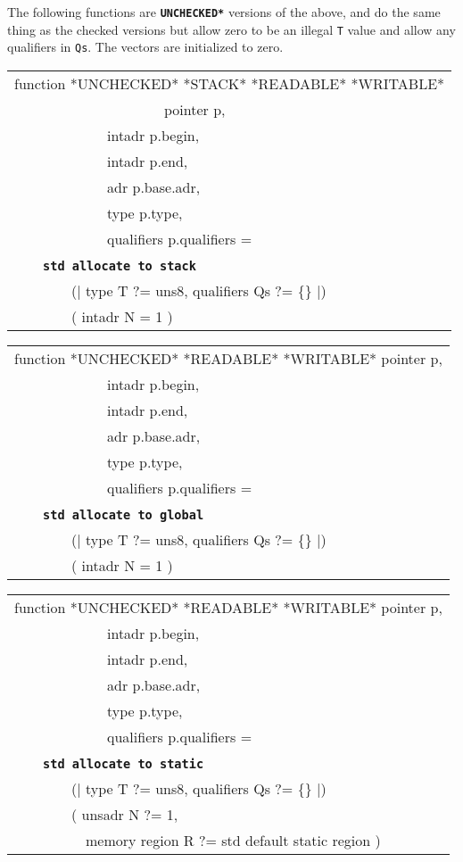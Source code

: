 \documentclass[12pt]{article}
\makeatletter
\newcommand{\TT}[1]{{\tt \bfseries #1}}
\newcommand{\ttstdkey}[1]{\TT{std #1}\index{#1@{\tt std #1}}}
\newenvironment{indpar}[1][0.3in]%
	{\begin{list}{}%
		     {\setlength{\itemsep}{0in}%
		      \setlength{\topsep}{0in}%
		      \setlength{\parsep}{1ex}%
		      \setlength{\labelwidth}{#1}%
		      \setlength{\leftmargin}{#1}%
		      \addtolength{\leftmargin}{\labelsep}}%
	 \item}%
	{\end{list}}
\makeatother
\begin{document}
The following functions are \TT{*UNCHECKED*} versions of the
above, and do the same thing as the checked versions but
allow zero to be an illegal {\tt T} value and allow any qualifiers
in {\tt Qs}.  The vectors are initialized to zero.

\begin{indpar}

{\tt\begin{tabular}{@{}l}
function *UNCHECKED* *STACK* *READABLE* *WRITABLE* \\
~~~~~~~~~~~~~~~~~~~~~pointer p, \\
~~~~~~~~~~~~~intadr p.begin, \\
~~~~~~~~~~~~~intadr p.end, \\
~~~~~~~~~~~~~adr p.base.adr, \\
~~~~~~~~~~~~~type p.type, \\
~~~~~~~~~~~~~qualifiers p.qualifiers = \\
~~~~\ttstdkey{allocate to stack} \\
~~~~~~~~(| type T ?= uns8, qualifiers Qs ?= \{\} |) \\
~~~~~~~~( intadr N = 1 ) \\
\end{tabular}}

{\tt\begin{tabular}{@{}l}
function *UNCHECKED* *READABLE* *WRITABLE* pointer p, \\
~~~~~~~~~~~~~intadr p.begin, \\
~~~~~~~~~~~~~intadr p.end, \\
~~~~~~~~~~~~~adr p.base.adr, \\
~~~~~~~~~~~~~type p.type, \\
~~~~~~~~~~~~~qualifiers p.qualifiers = \\
~~~~\ttstdkey{allocate to global} \\
~~~~~~~~(| type T ?= uns8, qualifiers Qs ?= \{\} |) \\
~~~~~~~~( intadr N = 1 ) \\
\end{tabular}}

{\tt\begin{tabular}{@{}l}
function *UNCHECKED* *READABLE* *WRITABLE* pointer p, \\
~~~~~~~~~~~~~intadr p.begin, \\
~~~~~~~~~~~~~intadr p.end, \\
~~~~~~~~~~~~~adr p.base.adr, \\
~~~~~~~~~~~~~type p.type, \\
~~~~~~~~~~~~~qualifiers p.qualifiers = \\
~~~~\ttstdkey{allocate to static} \\
~~~~~~~~(| type T ?= uns8, qualifiers Qs ?= \{\} |) \\
~~~~~~~~( unsadr N ?= 1, \\
~~~~~~~~~~memory region R ?= std default static region ) \\
\end{tabular}}


\end{indpar}
\end{document}
